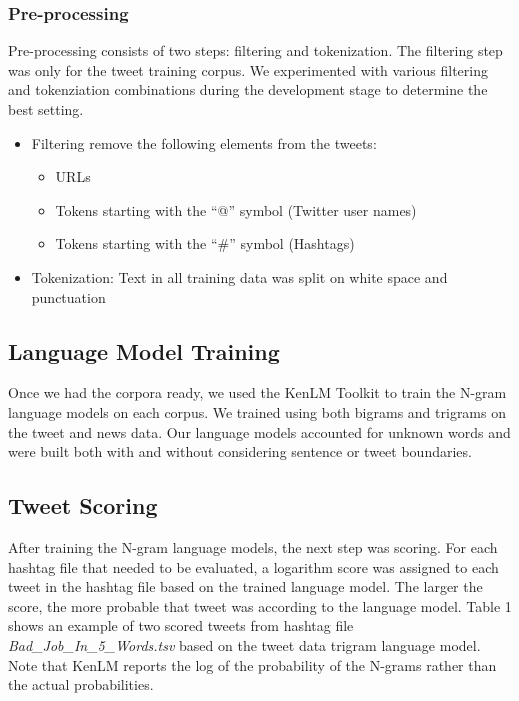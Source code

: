 \documentclass[11pt,a4paper]{article}
\begin{document}
\subsubsection{Pre-processing}

Pre-processing consists of two steps: filtering and tokenization. The filtering step was only for the tweet training corpus. 
We experimented with various filtering and tokenziation combinations during the development stage to determine the best setting. 

\begin{itemize}
\item Filtering remove the following elements from the tweets:
\begin{itemize}
\item URLs 
\item Tokens starting with the ``@'' symbol (Twitter user names)
\item Tokens starting with the ``\#'' symbol (Hashtags)
\end{itemize}
\item Tokenization: Text in all training data was split on white space and punctuation
\end{itemize}

\subsection{Language Model Training}

Once we had the corpora ready, we used the KenLM Toolkit to train the N-gram language models on each corpus. 
We trained using both bigrams and trigrams on
the tweet and news data. Our language models accounted for unknown words and were built both with and 
without considering sentence or tweet boundaries. 

\subsection{Tweet Scoring}

After training the N-gram language models, the next step was scoring. For each hashtag file that needed 
to be evaluated, a logarithm score was assigned to each tweet in the hashtag file based on the trained language model.
The larger the score, the more probable that tweet was according to the language model. Table 1 shows an example of two 
scored tweets from hashtag file \textit{Bad\_Job\_In\_5\_Words.tsv} based on the tweet data trigram language model.
Note that KenLM reports the log of the probability of the N-grams rather than the actual
probabilities.
\end{document}
